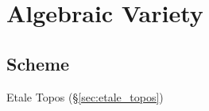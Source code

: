 \section{Algebraic Variety}\label{sec:algebraic_variety}

\subsection{Scheme}\label{sec:scheme}

Etale Topos (\S\ref{sec:etale_topos})
